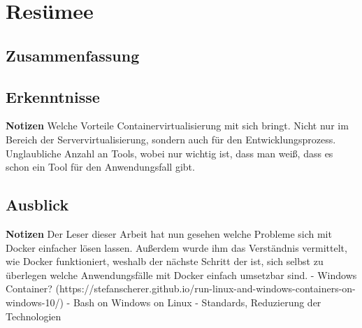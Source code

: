 
\chapter{Resümee}
\section{Zusammenfassung}

\section{Erkenntnisse}
\textbf{Notizen}
Welche Vorteile Containervirtualisierung mit sich bringt. Nicht nur im Bereich der Servervirtualisierung, sondern auch für den Entwicklungsprozess.
Unglaubliche Anzahl an Tools, wobei nur wichtig ist, dass man weiß, dass es schon ein Tool für den Anwendungsfall gibt.

\section{Ausblick}
\textbf{Notizen}
Der Leser dieser Arbeit hat nun gesehen welche Probleme sich mit Docker einfacher lösen lassen. Außerdem wurde ihm das Verständnis vermittelt, wie Docker funktioniert, weshalb der nächste Schritt der ist, sich selbst zu überlegen welche Anwendungsfälle mit Docker einfach umsetzbar sind.
- Windows Container? (https://stefanscherer.github.io/run-linux-and-windows-containers-on-windows-10/)
- Bash on Windows on Linux
- Standards, Reduzierung der Technologien
